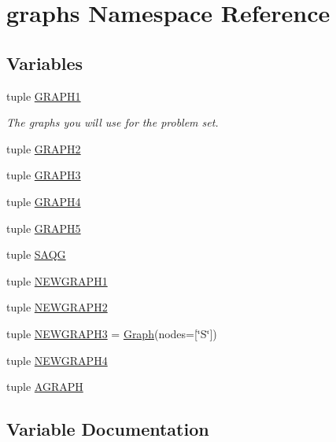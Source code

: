 \hypertarget{namespacegraphs}{}\section{graphs Namespace Reference}
\label{namespacegraphs}
\subsection*{Variables}
\begin{DoxyCompactItemize}
\item 
tuple \hyperlink{namespacegraphs_a19f04d81ba0467a7f69415bcf71409db}{G\+R\+A\+P\+H1}
\begin{DoxyCompactList}\small\item\em The graphs you will use for the problem set. \end{DoxyCompactList}\item 
tuple \hyperlink{namespacegraphs_ad5bc68c2b725ccc0c1ec6df745d605c8}{G\+R\+A\+P\+H2}
\item 
tuple \hyperlink{namespacegraphs_ae1928e75cd53a1fe3a92fe7b5519ba68}{G\+R\+A\+P\+H3}
\item 
tuple \hyperlink{namespacegraphs_a71e8d3e8053782d78d30e3661cb731d6}{G\+R\+A\+P\+H4}
\item 
tuple \hyperlink{namespacegraphs_af8cb560a89de7afc3b01d32223a5b80f}{G\+R\+A\+P\+H5}
\item 
tuple \hyperlink{namespacegraphs_ab79b321ca7aaeaa5719c63f369ccc780}{S\+A\+Q\+G}
\item 
tuple \hyperlink{namespacegraphs_ae7c695b2068bab8045d93538cfc6b9f6}{N\+E\+W\+G\+R\+A\+P\+H1}
\item 
tuple \hyperlink{namespacegraphs_aa9d133c69e3c2a88607b5ce7a3b43754}{N\+E\+W\+G\+R\+A\+P\+H2}
\item 
tuple \hyperlink{namespacegraphs_aedb230b38d5f073048723436245bef7d}{N\+E\+W\+G\+R\+A\+P\+H3} = \hyperlink{classsearch_1_1_graph}{Graph}(nodes=\mbox{[}\char`\"{}S\char`\"{}\mbox{]})
\item 
tuple \hyperlink{namespacegraphs_a45b53eabbf4f285b22b4caa5e3376bd9}{N\+E\+W\+G\+R\+A\+P\+H4}
\item 
tuple \hyperlink{namespacegraphs_a427450b6287d6cb549b6243dee6d4253}{A\+G\+R\+A\+P\+H}
\end{DoxyCompactItemize}


\subsection{Variable Documentation}
\hypertarget{namespacegraphs_a427450b6287d6cb549b6243dee6d4253}{}
